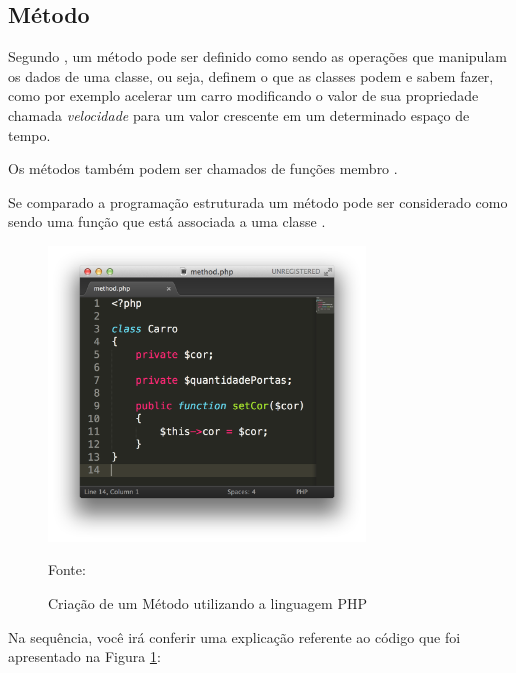 \subsection{Método}

Segundo , um
método pode ser definido como sendo as operações que manipulam os dados de uma
classe, ou seja, definem o que as classes podem e sabem fazer, como por exemplo
acelerar um carro modificando o valor de sua propriedade chamada
\textit{velocidade} para um valor crescente em um determinado espaço de tempo.

Os métodos também podem ser chamados de funções membro \cite{c++ComoProgramar}.

Se comparado a programação estruturada um método pode ser considerado como sendo
uma função que está associada a uma classe \cite{programmingPhp}.

\begin{figure}[h!tb]
	\caption{Criação de um Método utilizando a linguagem PHP}
	\label{fig:metodo}

	\centering
	\includegraphics[width=0.75\textwidth]{images/method.png}

	\centering
	\footnotesize Fonte: \fonteOAutor
\end{figure}

\FloatBarrier 	%

Na sequência, você irá conferir uma explicação referente ao código que foi
apresentado na Figura \ref{fig:metodo}:

